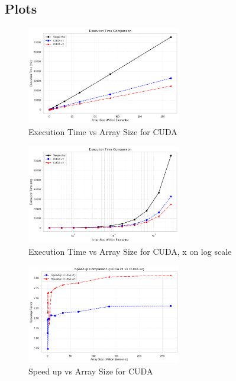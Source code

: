 \documentclass{article}
\begin{document}
\subsection*{Plots}

\begin{figure}[h]
  \centering
  \includegraphics[width=0.6\textwidth]{Images/plot1.png}
  \caption{Execution Time vs Array Size for CUDA}
\end{figure}

\begin{figure}[h]
  \centering
  \includegraphics[width=0.6\textwidth]{Images/plot2.png}
  \caption{Execution Time vs Array Size for CUDA, x on log scale}
\end{figure}

\begin{figure}[h]
  \centering
  \includegraphics[width=0.6\textwidth]{Images/plot3.png}
  \caption{Speed up vs Array Size for CUDA}
\end{figure}
\end{document}

